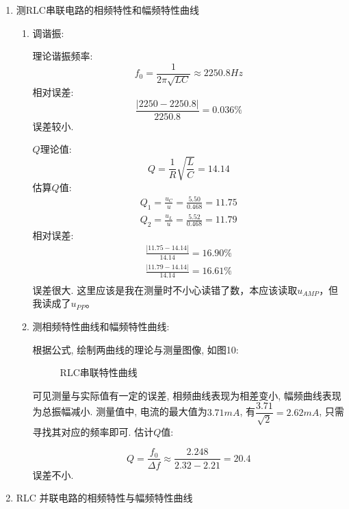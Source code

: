 \documentclass[11pt]{article}
\begin{document}
\begin{enumerate}

\item 测RLC串联电路的相频特性和幅频特性曲线

\begin{enumerate}

\item 调谐振:

理论谐振频率:
\[
    f_0 = \frac{1}{2\pi\sqrt{LC}} \approx 2250.8 \unit{Hz} 
\]
相对误差:
\[
    \frac{|2250-2250.8|}{2250.8} = 0.036\%
\]
误差较小.

$Q$理论值:
\[
    Q = \frac{1}{R}\sqrt{\frac{L}{C}} = 14.14
\]
估算$Q$值:
\begin{gather*}
    Q_1 = \frac{u_C}{u} = \frac{5.50}{0.468} = 11.75\\
    Q_2 = \frac{u_L}{u} = \frac{5.52}{0.468} = 11.79
\end{gather*}
相对误差:
\begin{gather*}
    \frac{|11.75-14.14|}{14.14} = 16.90\%\\
    \frac{|11.79-14.14|}{14.14} = 16.61\%\\
\end{gather*}
误差很大. 这里应该是我在测量时不小心读错了数，本应该读取$u_{AMP}$，但我读成了$u_{PP}$。

\item 测相频特性曲线和幅频特性曲线:

根据公式, 绘制两曲线的理论与测量图像, 如图10:

\begin{figure}[H]
    \centering
    \caption{RLC串联特性曲线}
\end{figure}

可见测量与实际值有一定的误差, 相频曲线表现为相差变小, 幅频曲线表现为总振幅减小. 测量值中, 电流的最大值为$3.71\unit{mA}$, 有$\dfrac{3.71}{\sqrt{2}} = 2.62\unit{mA}$, 只需寻找其对应的频率即可. 估计$Q$值:

\[
    Q = \frac{f_0}{\Delta f} \approx \frac{2.248}{2.32-2.21}=20.4
\]
误差不小.

\end{enumerate}

\item RLC 并联电路的相频特性与幅频特性曲线


\begin{enumerate}


\end{enumerate}
\end{enumerate}
\end{document}

